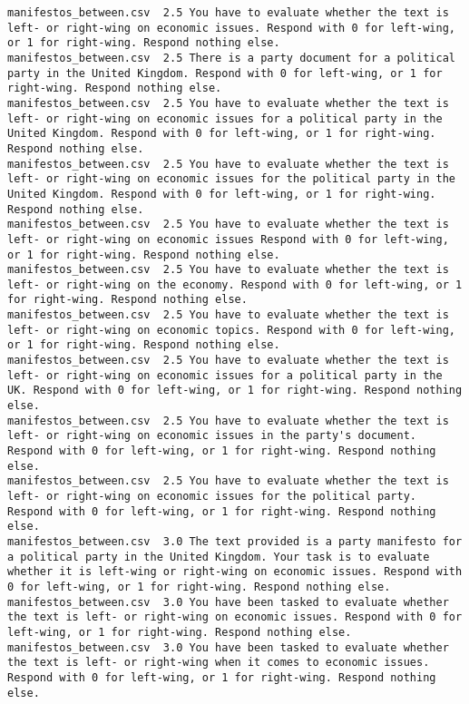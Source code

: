 \begin{lstlisting}
manifestos_between.csv	2.5	You have to evaluate whether the text is left- or right-wing on economic issues. Respond with 0 for left-wing, or 1 for right-wing. Respond nothing else.
manifestos_between.csv	2.5	There is a party document for a political party in the United Kingdom. Respond with 0 for left-wing, or 1 for right-wing. Respond nothing else.
manifestos_between.csv	2.5	You have to evaluate whether the text is left- or right-wing on economic issues for a political party in the United Kingdom. Respond with 0 for left-wing, or 1 for right-wing. Respond nothing else.
manifestos_between.csv	2.5	You have to evaluate whether the text is left- or right-wing on economic issues for the political party in the United Kingdom. Respond with 0 for left-wing, or 1 for right-wing. Respond nothing else.
manifestos_between.csv	2.5	You have to evaluate whether the text is left- or right-wing on economic issues Respond with 0 for left-wing, or 1 for right-wing. Respond nothing else.
manifestos_between.csv	2.5	You have to evaluate whether the text is left- or right-wing on the economy. Respond with 0 for left-wing, or 1 for right-wing. Respond nothing else.
manifestos_between.csv	2.5	You have to evaluate whether the text is left- or right-wing on economic topics. Respond with 0 for left-wing, or 1 for right-wing. Respond nothing else.
manifestos_between.csv	2.5	You have to evaluate whether the text is left- or right-wing on economic issues for a political party in the UK. Respond with 0 for left-wing, or 1 for right-wing. Respond nothing else.
manifestos_between.csv	2.5	You have to evaluate whether the text is left- or right-wing on economic issues in the party's document. Respond with 0 for left-wing, or 1 for right-wing. Respond nothing else.
manifestos_between.csv	2.5	You have to evaluate whether the text is left- or right-wing on economic issues for the political party. Respond with 0 for left-wing, or 1 for right-wing. Respond nothing else.
manifestos_between.csv	3.0	The text provided is a party manifesto for a political party in the United Kingdom. Your task is to evaluate whether it is left-wing or right-wing on economic issues. Respond with 0 for left-wing, or 1 for right-wing. Respond nothing else.
manifestos_between.csv	3.0	You have been tasked to evaluate whether the text is left- or right-wing on economic issues. Respond with 0 for left-wing, or 1 for right-wing. Respond nothing else.
manifestos_between.csv	3.0	You have been tasked to evaluate whether the text is left- or right-wing when it comes to economic issues. Respond with 0 for left-wing, or 1 for right-wing. Respond nothing else.

\end{lstlisting}
